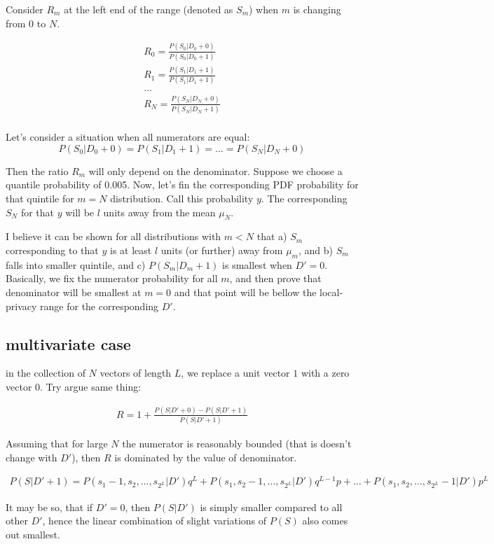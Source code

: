 \documentclass[11pt,draft]{article}
\begin{document}
Consider $R_m$ at the left end of the range (denoted as $S_m$) when $m$ is changing from $0$ to $N$.   

\begin{align}
R_0 =  \frac{P(S_0|D_0+0)}{P(S_0|D_0+1)}  \\
R_1 =  \frac{P(S_1|D_1+1)}{P(S_1|D_1+1)}  \\
... \\
R_N =  \frac{P(S_N|D_N+0)}{P(S_N|D_N+1)}  \\
\end{align}

Let's consider a situation when all numerators are equal:
\[
P(S_0|D_0+0) = P(S_1|D_1+1) = ... = P(S_N|D_N+0)
\]

Then the ratio $R_m$ will only depend on the denominator.   Suppose we choose a quantile probability of 0.005.  Now,  let's fin the corresponding PDF probability for that quintile for $m=N$ distribution.  Call this probability $y$.
The corresponding $S_N$ for that $y$ will be $l$ units away from the mean $\mu_N$.  

I believe it can be shown for all distributions with $m<N$  that  a) $S_m$ corresponding to that $y$ is at least $l$ units (or further) away from $\mu_m$,  and b)  $S_m$ falls into smaller quintile, and c)  $P(S_m|D_m+1)$ is smallest when $D'=0$.   Basically, we fix the numerator probability for all $m$, and then prove that denominator will be smallest at $m=0$ and that point will be bellow the local-privacy range for the corresponding $D'$.

\subsection{multivariate case}

in the collection of $N$ vectors of length $L$, we replace a unit vector $1$ with a zero vector $0$.  Try argue same thing:

\begin{align}
R = 1 +  \frac{P(S|D'+0) - P(S|D'+1)}{P(S|D'+1)}
\end{align}

Assuming that for large $N$ the numerator is reasonably bounded (that is doesn't change with $D'$), then $R$ is dominated by the value of denominator.

\begin{align}
P(S|D'+1) = P(s_1-1,s_2,\dots,s_{2^L}|D') q^L + P(s_1,s_2-1,\dots,s_{2^L}|D') q^{L-1}p  + \dots + P(s_1,s_2,\dots,s_{2^L} - 1|D') p^L
\end{align}

It may be so, that if $D' = 0$, then $P(S|D')$ is simply smaller compared to all other $D'$, hence the linear combination of slight variations of $P(S)$ also comes out smallest.
\end{document}
